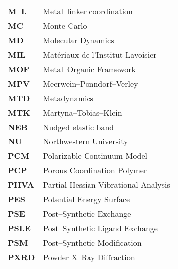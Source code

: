 \begin{longtable}{p{} p{}}
\textbf{M--L} & Metal--linker coordination \\
\textbf{MC} & Monte Carlo \\
\textbf{MD} & Molecular Dynamics \\
\textbf{MIL} & Mat{\'e}riaux de l'Institut Lavoisier \\
\textbf{MOF} & Metal--Organic Framework \\
\textbf{MPV} & Meerwein--Ponndorf--Verley\\
\textbf{MTD} & Metadynamics \\
\textbf{MTK} & Martyna--Tobias--Klein \\
\textbf{NEB} & Nudged elastic band \\
\textbf{NU} & Northwestern University \\
\textbf{PCM} & Polarizable Continuum Model \\
\textbf{PCP} & Porous Coordination Polymer \\
\textbf{PHVA} & Partial Hessian Vibrational Analysis \\
\textbf{PES} & Potential Energy Surface \\
\textbf{PSE} & Post--Synthetic Exchange\\
\textbf{PSLE} & Post--Synthetic Ligand Exchange\\
\textbf{PSM} & Post--Synthetic Modification\\
\textbf{PXRD} & Powder X--Ray Diffraction\\

\end{longtable}
